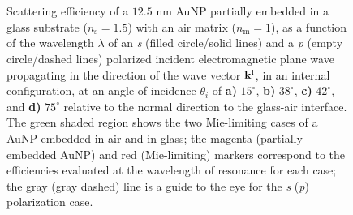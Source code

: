\begin{figure}[t!]\small \centering
    \hspace*{-.675\textwidth}%
        \begin{subfigure}{.735\textwidth}\caption{ }\label{sfig:Inc:Sca:15}\end{subfigure}%
        \begin{subfigure}{.25\textwidth}\caption{ }\label{sfig:Inc:Sca:38}\end{subfigure} \\[17em]
    \hspace*{-.675\textwidth}%
        \begin{subfigure}{.735\textwidth}\caption{ }\label{sfig:Inc:Sca:42}\end{subfigure}%
        \begin{subfigure}{.25\textwidth}\caption{ }\label{sfig:Inc:Sca:75}\end{subfigure} \\[-19.9em]
    \def\svgwidth{.95\textwidth}
    \vspace*{-.5em}
    \caption[Scattering Efficiency of a partially embedded 12.5 nm AuNP into a substrate Illuminated in an internal configuration at oblique incidence]{%
    Scattering efficiency of a $12.5$ nm AuNP partially embedded in a glass substrate ($n_\text{s} = 1.5$) with an air matrix ($n_\text{m} = 1$), as a function of the wavelength $\lambda$ of an \textit{s} (filled circle/solid lines) and a \textit{p} (empty circle/dashed lines) polarized incident electromagnetic plane wave propagating in the direction of the wave vector $\vb{k}^\text{i}$, in an internal configuration, at an angle of incidence $\theta_i$ of \textbf{a)} $15^\circ$, \textbf{b)} $38^\circ$, \textbf{c)} $42^\circ$, and \textbf{d)} $75^\circ$  relative to the normal direction to the glass-air interface. The green shaded region shows the two Mie-limiting cases of a AuNP embedded in air
and in glass; the magenta (partially embedded AuNP) and red (Mie-limiting) markers correspond to the efficiencies evaluated at the wavelength of resonance for each case; the gray (gray dashed) line is a guide to the eye for the \textit{s} (\textit{p}) polarization case.
}
\label{fig:Inc:Sca}
\end{figure}

